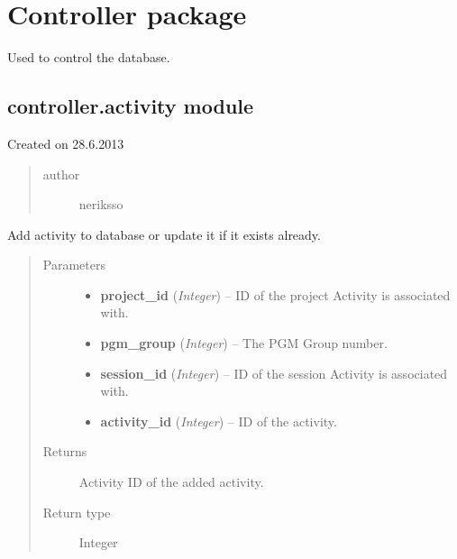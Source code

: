 \documentclass[letterpaper,10pt,english]{sphinxmanual}
\begin{document}
\section{Controller package}
\label{controller::doc}\label{controller:controller-package}
Used to control the database.


\subsection{controller.activity module}
\label{controller:module-controller.activity}\label{controller:controller-activity-module}
Created on 28.6.2013
\begin{quote}\begin{description}
\item[{author}] \leavevmode
neriksso

\end{description}\end{quote}

\begin{fulllineitems}
\label{controller:controller.activity.add_or_update_activity}
Add activity to database or update it if it exists already.
\begin{quote}\begin{description}
\item[{Parameters}] \leavevmode\begin{itemize}
\item {} 
\textbf{project\_id} (\emph{Integer}) -- ID of the project Activity is associated with.

\item {} 
\textbf{pgm\_group} (\emph{Integer}) -- The PGM Group number.

\item {} 
\textbf{session\_id} (\emph{Integer}) -- ID of the session Activity is associated with.

\item {} 
\textbf{activity\_id} (\emph{Integer}) -- ID of the activity.

\end{itemize}

\item[{Returns}] \leavevmode
Activity ID of the added activity.

\item[{Return type}] \leavevmode
Integer

\end{description}\end{quote}

\end{fulllineitems}
\end{document}
